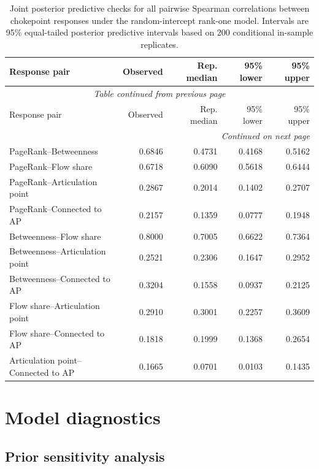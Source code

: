 \documentclass[pdftex,12pt,openright,a4paper,oneside]{book}
\begin{document}
\begingroup
\small
\setlength{\LTleft}{0pt}
\setlength{\LTright}{0pt}
\begin{longtable}{lrrrr}
\caption{Joint posterior predictive checks for all pairwise Spearman correlations between chokepoint responses under the random-intercept rank-one model. Intervals are 95\% equal-tailed posterior predictive intervals based on 200 conditional in-sample replicates.}
\label{tab:node_chokepoint_joint_ppc_full}\\
\toprule
Response pair & Observed & Rep. median & 95\% lower & 95\% upper \\
\midrule
\endfirsthead
\multicolumn{5}{c}{\textit{Table continued from previous page}}\\
\toprule
Response pair & Observed & Rep. median & 95\% lower & 95\% upper \\
\midrule
\endhead
\midrule
\multicolumn{5}{r}{\textit{Continued on next page}}\\
\endfoot
\bottomrule
\endlastfoot
PageRank--Betweenness & 0.6846 & 0.4731 & 0.4168 & 0.5162 \\
PageRank--Flow share & 0.6718 & 0.6090 & 0.5618 & 0.6444 \\
PageRank--Articulation point & 0.2867 & 0.2014 & 0.1402 & 0.2707 \\
PageRank--Connected to AP & 0.2157 & 0.1359 & 0.0777 & 0.1948 \\
Betweenness--Flow share & 0.8000 & 0.7005 & 0.6622 & 0.7364 \\
Betweenness--Articulation point & 0.2521 & 0.2306 & 0.1647 & 0.2952 \\
Betweenness--Connected to AP & 0.3204 & 0.1558 & 0.0937 & 0.2125 \\
Flow share--Articulation point & 0.2910 & 0.3001 & 0.2257 & 0.3609 \\
Flow share--Connected to AP & 0.1818 & 0.1999 & 0.1368 & 0.2654 \\
Articulation point--Connected to AP & 0.1665 & 0.0701 & 0.0103 & 0.1435 \\
\end{longtable}
\endgroup

\chapter{Model diagnostics}
\label{app:model_diagnostics}

\section{Prior sensitivity analysis}
\label{app:prior_sensitivity}
\end{document}
